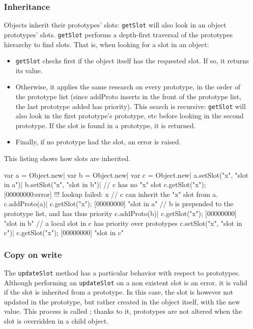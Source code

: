 \subsubsection{Inheritance}

Objects inherit their prototypes' slots: \lstinline|getSlot| will also
look in an object prototypes' slots. \lstinline|getSlot| performs a
depth-first traversal of the prototypes hierarchy to find slots. That
is, when looking for a slot in an object:

\begin{itemize}
\item \lstinline|getSlot| checks first if the object itself has the
  requested slot. If so, it returns its value.
\item Otherwise, it applies the same research on every prototype, in
  the order of the prototype list (since addProto inserts in the front
  of the prototype list, the last prototype added has priority). This
  search is recursive: \lstinline|getSlot| will also look in the first
  prototype's prototype, etc before looking in the second
  prototype. If the slot is found in a prototype, it is returned.
\item Finally, if no prototype had the slot, an error is raised.
\end{itemize}

This listing shows how slots are inherited.

\begin{urbiscript}[firstnumber=last]
var a = Object.new|
var b = Object.new|
var c = Object.new|
a.setSlot("x", "slot in a")|
b.setSlot("x", "slot in b")|
// c has no "x" slot
c.getSlot("x");
[00000000:error] !!! lookup failed: x
// c can inherit the "x" slot from a.
c.addProto(a)|
c.getSlot("x");
[00000000] "slot in a"
// b is prepended to the prototype list, and has thus priority
c.addProto(b)|
c.getSlot("x");
[00000000] "slot in b"
// a local slot in c has priority over prototypes
c.setSlot("x", "slot in c")|
c.getSlot("x");
[00000000] "slot in c"
\end{urbiscript}

\subsubsection{Copy on write}

The \lstinline|updateSlot| method has a particular behavior with
respect to prototypes. Although performing an \lstinline|updateSlot|
on a non existent slot is an error, it is valid if the slot is
inherited from a prototype. In this case, the slot is however not
updated in the prototype, but rather created in the object itself,
with the new value. This process is called ; thanks
to it, prototypes are not altered when the slot is overridden in a
child object.

